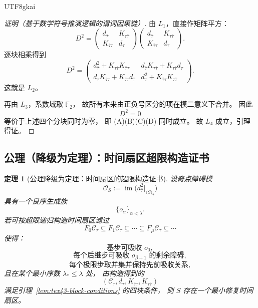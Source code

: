 \documentclass[12pt]{article}
\newtheorem{theorem}{定理}[section]
\newcommand{\Ftwo}{\mathbb{F}_2}
\begin{document}
\begin{CJK*}{UTF8}{gkai}
\begin{proof}[证明（基于数学符号推演逻辑的谓词因果链）]
由 $L_1$，直接作矩阵平方：
\[
  D^2=
  \begin{pmatrix}
    d_{\bar\tau} & K_{\tau\bar\tau}\\
    K_{\bar\tau\tau} & d_\tau
  \end{pmatrix}
  \begin{pmatrix}
    d_{\bar\tau} & K_{\tau\bar\tau}\\
    K_{\bar\tau\tau} & d_\tau
  \end{pmatrix}.
\]
逐块相乘得到
\[
  D^2=
  \begin{pmatrix}
    d_{\bar\tau}^2 + K_{\tau\bar\tau}K_{\bar\tau\tau}
    &
    d_{\bar\tau}K_{\tau\bar\tau}+K_{\tau\bar\tau}d_\tau\\
    d_\tau K_{\bar\tau\tau}+K_{\bar\tau\tau}d_{\bar\tau}
    &
    d_\tau^2 + K_{\bar\tau\tau}K_{\tau\bar\tau}
  \end{pmatrix}.
\]
这就是 $L_2$。

再由 $L_3$，系数域取 $\Ftwo$，
故所有本来由正负号区分的项在模二意义下合并。
因此
\[
  D^2=0
\]
等价于上述四个分块同时为零，
即 (A)(B)(C)(D) 同时成立。
故 $L_4$ 成立，引理得证。
\end{proof}

\subsection{公理（降级为定理）：时间扇区超限构造证书}
\label{subsec:tex43-ch8-axiom-downgrade}

\begin{theorem}[公理降级为定理：时间扇区的超限构造证书]
\label{thm:tex43-time-sector-transfinite}
设奇点障碍模
\[
  \mathcal O_S
  :=
  \operatorname{im}
  \Big(
    d_{\bar\tau}^2\big|_{\langle S\rangle_{\bar\tau}}
  \Big)
\]
具有一个良序生成族
\[
  \{o_\alpha\}_{\alpha<\lambda}.
\]
若可按超限递归构造时间扇区滤过
\[
  F_0\mathcal C_\tau \subseteq F_1\mathcal C_\tau \subseteq \cdots \subseteq F_\mu\mathcal C_\tau \subseteq \cdots
\]
使得：
\[
  \text{基步可吸收 }o_0,
\]
\[
  \text{每个后继步可吸收 }o_{\beta+1}\text{ 的剩余障碍},
\]
\[
  \text{每个极限步取并集并保持先前吸收关系},
\]
且在某个最小序数 $\lambda_\ast\le \lambda$ 处，
由构造得到的
\[
  (\mathcal C_\tau,d_\tau,K_{\bar\tau\tau},K_{\tau\bar\tau})
\]
满足引理~\ref{lem:tex43-block-conditions} 的四块条件，
则 $S$ 存在一个最小修复时间扇区。
\end{theorem}


\end{CJK*}
\end{document}
